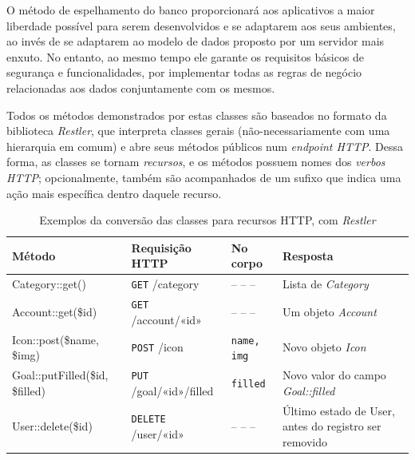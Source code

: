 \documentclass[a4paper]{abnt}
\begin{document}
O método de espelhamento do banco proporcionará aos aplicativos a maior liberdade possível para serem desenvolvidos e se adaptarem aos seus ambientes, ao invés de se adaptarem ao modelo de dados proposto por um servidor mais enxuto. No entanto, ao mesmo tempo ele garante os requisitos básicos de segurança e funcionalidades, por implementar todas as regras de negócio relacionadas aos dados conjuntamente com os mesmos.

Todos os métodos demonstrados por estas classes são baseados no formato da biblioteca \emph{Restler}, que interpreta classes gerais (não-necessariamente com uma hierarquia em comum) e abre seus métodos públicos num \emph{endpoint HTTP}. Dessa forma, as classes se tornam \emph{recursos}, e os métodos possuem nomes dos \emph{verbos HTTP}; opcionalmente, também são acompanhados de um sufixo que indica uma ação mais específica dentro daquele recurso.

\begin{table}[hb]
\begin{flushleft}
\begin{tabular}{|lllp{4.2cm}|}
	\hline
	\textbf{Método}					& \textbf{Requisição HTTP}		& \textbf{No corpo}	& \textbf{Resposta}			\\\hline
	Category::get()					& \texttt{GET} /category			& -- -- --			& Lista de \emph{Category}	\\\hline
	Account::get(\$id)				& \texttt{GET} /account/«id»		& -- -- --			& Um objeto \emph{Account}	\\\hline
	Icon::post(\$name, \$img)			& \texttt{POST} /icon			& \texttt{name, img}	& Novo objeto \emph{Icon}		\\\hline
	Goal::putFilled(\$id, \$filled)	& \texttt{PUT} /goal/«id»/filled	& \texttt{filled}	& Novo valor do campo \emph{Goal::filled} \\\hline
	User::delete(\$id)				& \texttt{DELETE} /user/«id»		& -- -- --			& Último estado de User, antes do registro ser removido \\\hline
\end{tabular} 
\end{flushleft}
\caption{Exemplos da convers\~ao das classes para recursos HTTP, com \emph{Restler}}
\end{table}
	
\end{document}
